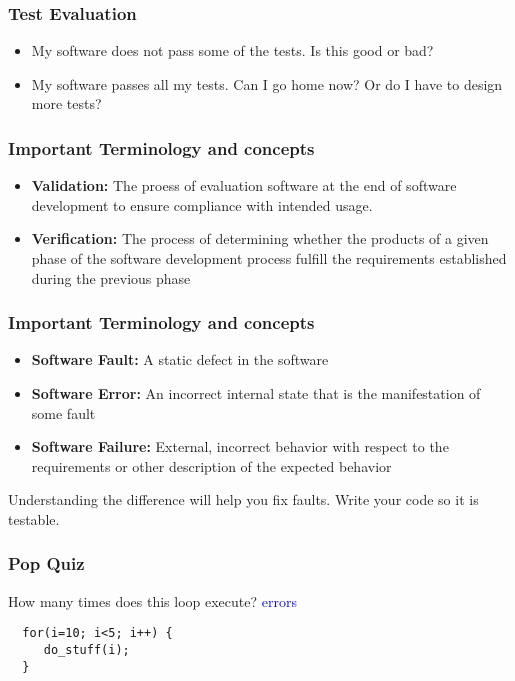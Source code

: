 \documentclass{beamer}
\begin{document}
\begin{frame}
  \frametitle{Test Evaluation}
  \begin{itemize}
  \item My software does not pass some of the tests. Is this good or
    bad?
  \item My software passes all my tests. Can I go home now? Or do I
    have to design more tests?
  \end{itemize}
\end{frame}
\begin{frame}
  \frametitle{Important Terminology and concepts}

  \begin{itemize}
  \item {\bf Validation:} The proess of evaluation software at the end
    of software development to ensure compliance with intended usage.
  \item {\bf Verification:} The process of determining whether the
    products of a given phase of the software development process
    fulfill the requirements established during the previous phase
  \end{itemize}
  
\end{frame}
\begin{frame}
  \frametitle{Important Terminology and concepts}
  \begin{itemize}
  \item  {\bf Software Fault:} A static defect in the software
  \item {\bf Software Error:} An incorrect internal state that is the
    manifestation of some fault 
  \item {\bf  Software Failure:} External,
    incorrect behavior with respect to the requirements or other
    description of the expected behavior
  \end{itemize}
Understanding the difference will help you fix faults. Write your code
so it is testable.
\end{frame}
\begin{frame}[fragile]
  \frametitle{Pop Quiz}
  How many times does this loop execute?
 \textcolor{blue}{errors}\begin{lstlisting}
  for(i=10; i<5; i++) {
     do_stuff(i);
  }
\end{lstlisting}

\end{frame}
\end{document}

